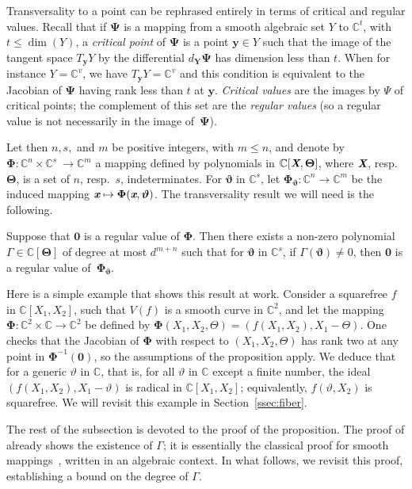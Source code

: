 \documentclass[sigconf]{acmart}
\def\Xb{\textit{\textbf{X}}}
\def\Thetab{\bm{\Theta}}
\def\thetab{\bm{\vartheta}}
\def\xb{\textit{\textbf{x}}}
\def\C{\mathbb{C}}
\def\dt{s}
\begin{document}
Transversality to a point can be rephrased entirely in terms of
critical and regular values. Recall that if $\bm \Psi$ is a mapping
from a smooth algebraic set $Y$ to $\C^t$, with $t\le \dim(Y)$, a {\em
  critical point} of $\bm \Psi$ is a point $\bm y \in Y$ such that the
image of the tangent space $T_{\bm y} Y$ by the differential $d_{\bm
  Y} \bm \Psi$ has dimension less than $t$. When for instance
$Y=\C^v$, we have $T_{\bm y} Y=\C^v$ and this condition is equivalent
to the Jacobian of $\bm \Psi$ having rank less than $t$ at $\bm y$.
{\em Critical values} are the images by $\Psi$ of critical points; the
complement of this set are the {\em regular values} (so a regular
value is not necessarily in the image of~$\bm\Psi$).

Let then $n,\dt,$ and $m$ be positive integers, with $m \le n$, and denote
by $\bm\Phi :\C^n \times \C^{\dt} ~ \rightarrow \C^{m}$ a mapping
defined by polynomials in $\C[\Xb,\Thetab]$, where $\Xb$,
resp.\ $\Thetab$, is a set of $n$, resp.\ $\dt$, indeterminates.  For
$\thetab$ in $\C^{\dt}$, let $\bm\Phi_{\thetab} : \C^n \rightarrow
\C^{m}$ be the induced mapping $\xb\mapsto \bm\Phi(\xb,\thetab)$.  The
transversality result we will need is the following.

\begin{proposition} \label{prop:weak_t}
  Suppose that $\bm 0$ is a regular value of $\bm\Phi$. Then there
  exists a non-zero polynomial $\Gamma \in \C[\Thetab]$ of degree at
  most $d^{m+n}$ such that for $\thetab$ in $\C^\dt$, if
  $\Gamma(\thetab)\ne 0$, then $\bm 0$ is a regular value
  of~$\bm\Phi_{\thetab}$.
\end{proposition}

Here is a simple example that shows this result at work. Consider a
squarefree $f$ in $\C[X_1,X_2]$, such that $V(f)$ is a smooth curve in
$\C^2$, and let the mapping $\bm\Phi:\C^2\times \C \to \C^2$ be
defined by $\bm\Phi(X_1,X_2,\Theta) = (f(X_1,X_2), X_1-\Theta)$. One
checks that the Jacobian of $\bm\Phi$ with respect to
$(X_1,X_2,\Theta)$ has rank two at any point in $\bm\Phi^{-1}(\bm 0)$,
so the assumptions of the proposition apply. We deduce that for a
generic $\vartheta$ in $\C$, that is, for all $\vartheta$ in $\C$
except a finite number, the ideal $(f(X_1,X_2), X_1-\vartheta)$ is
radical in $\C[X_1,X_2]$; equivalently, $f(\vartheta, X_2)$ is
squarefree. We will revisit this example in Section~\ref{ssec:fiber}.

The rest of the subsection is devoted to the proof of the proposition.
The proof of \cite[Theorem B.3]{TWT} already shows the existence of
$\Gamma$; it is essentially the classical proof for smooth
mappings~\cite[Section~3.7]{demazure2000bifurcations}, written in an
algebraic context. In what follows, we revisit this proof,
establishing a bound on the degree of $\Gamma$.
\end{document}
